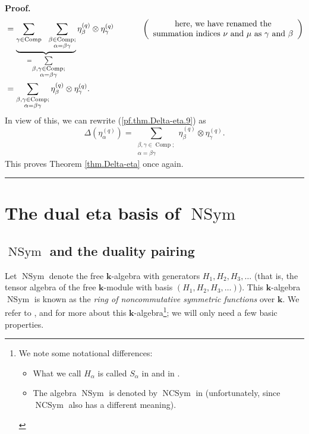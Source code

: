 \documentclass[numbers=enddot,12pt,final,onecolumn,notitlepage]{scrartcl}%
\theoremstyle{definition}
\newenvironment{proof}[1][Proof]{\noindent\textbf{#1.} }{\ \rule{0.5em}{0.5em}}
\let\sumnonlimits\sum
\renewcommand{\sum}{\sumnonlimits\limits}
\newenvironment{verlong}{}{}
\begin{document}
\begin{verlong}
\begin{proof}
\begin{align*}
&  =\underbrace{\sum_{\gamma\in\operatorname*{Comp}}\ \ \sum_{\substack{\beta
\in\operatorname*{Comp};\\\alpha=\beta\gamma}}}_{=\sum_{\substack{\beta
,\gamma\in\operatorname*{Comp};\\\alpha=\beta\gamma}}}\eta_{\beta}^{\left(
q\right)  }\otimes\eta_{\gamma}^{\left(  q\right)  }%
\ \ \ \ \ \ \ \ \ \ \left(
\begin{array}
[c]{c}%
\text{here, we have renamed the}\\
\text{summation indices }\nu\text{ and }\mu\text{ as }\gamma\text{ and }\beta
\end{array}
\right) \\
&  =\sum_{\substack{\beta,\gamma\in\operatorname*{Comp};\\\alpha=\beta\gamma
}}\eta_{\beta}^{\left(  q\right)  }\otimes\eta_{\gamma}^{\left(  q\right)  }.
\end{align*}
In view of this, we can rewrite (\ref{pf.thm.Delta-eta.9}) as%
\[
\Delta\left(  \eta_{\alpha}^{\left(  q\right)  }\right)  =\sum
_{\substack{\beta,\gamma\in\operatorname*{Comp};\\\alpha=\beta\gamma}%
}\eta_{\beta}^{\left(  q\right)  }\otimes\eta_{\gamma}^{\left(  q\right)  }.
\]
This proves Theorem \ref{thm.Delta-eta} once again.
\end{proof}
\end{verlong}

\section{\label{sec.dual}The dual eta basis of $\operatorname*{NSym}$}

\subsection{$\operatorname*{NSym}$ and the duality pairing}

Let $\operatorname*{NSym}$ denote the free $\mathbf{k}$-algebra with
generators $H_{1},H_{2},H_{3},\ldots$ (that is, the tensor algebra of the free
$\mathbf{k}$-module with basis $\left(  H_{1},H_{2},H_{3},\ldots\right)  $).
This $\mathbf{k}$-algebra $\operatorname*{NSym}$ is known as the \emph{ring of
noncommutative symmetric functions} over $\mathbf{k}$. We refer to
\cite[\S 5.4]{GriRei}, \cite{GKLLRT94} and \cite[\S 6.1]{Meliot17} for more
about this $\mathbf{k}$-algebra\footnote{We note some notational differences:
\par
\begin{itemize}
\item What we call $H_{\alpha}$ is called $S_{\alpha}$ in \cite{GKLLRT94} and
in \cite{Meliot17}.
\par
\item The algebra $\operatorname*{NSym}$ is denoted by $\operatorname*{NCSym}$
in \cite{Meliot17} (unfortunately, since $\operatorname*{NCSym}$ also has a
different meaning).
\end{itemize}
}; we will only need a few basic properties.
\end{document}
